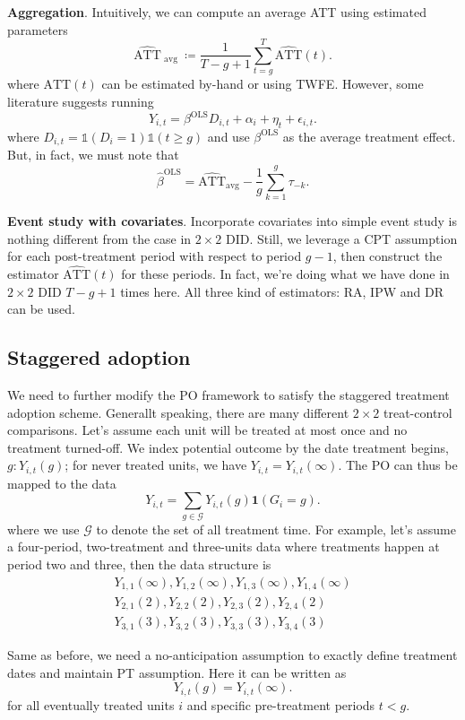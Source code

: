 \documentclass[12pt]{article}
\begin{document}
\textbf{Aggregation}. Intuitively, we can compute an average ATT using estimated parameters
\[
  \widehat{ \text{ATT} }_{\text{ avg }} \coloneqq \frac{1}{T-g+1} \sum_{t=g}^{T}
  \widehat{ \text{ATT} }(t)
.\]
where \( \text{ATT}(t) \) can be estimated by-hand or using TWFE. However, some
literature suggests  running
\[
  Y_{i,t} = \beta^{\text{OLS}} D_{i,t} + \alpha_i + \eta_t + \epsilon_{i,t}
.\]
where \( D_{i,t}=\mathbb{1}(D_{i}=1) \mathbb{1}(t \ge g) \) and use \( \beta^{\text{OLS}}
\) as the average treatment effect.
But, in fact, we must note that
\[
  \hat{\beta}^{\text{OLS}} = \widehat{\text{ATT}}_{\text{avg}} - \frac{1}{g}
  \sum_{k=1}^{g} \tau_{-k}
.\]

\textbf{Event study with covariates}. Incorporate covariates into simple event study is
nothing different from the case in
\( 2 \times 2 \) DID. Still, we leverage a CPT assumption for each post-treatment period
with respect to period \( g-1 \),
then construct the estimator \( \widehat{\text{ATT}}(t) \) for these periods. In fact,
we're doing what we have done
in \( 2 \times 2 \) DID \( T-g+1 \) times here. All three kind of estimators: RA, IPW and
DR can be used.

\subsection{Staggered adoption}

We need to further modify the PO framework to satisfy the staggered treatment adoption
scheme. Generallt speaking, there are
many different \( 2 \times 2 \) treat-control comparisons. Let's assume each unit will be
treated at most once and no
treatment turned-off. We index potential outcome by the date treatment begins, \( g:
Y_{i,t}(g) \); for never treated units,
we have \( Y_{i,t}=Y_{i,t}(\infty) \). The PO can thus be mapped to the data
\[
  Y_{i,t} = \sum_{g \in \mathcal{G}} Y_{i,t}(g) \mathbf{1}(G_{i}=g)
.\]
where we use \( \mathcal{G} \) to denote the set of all treatment time. For example,
let's assume a four-period, two-treatment
and three-units data where treatments happen at period two and three, then the data structure is
\begin{align*}
  Y_{1,1}(\infty),Y_{1,2}(\infty),Y_{1,3}(\infty),Y_{1,4}(\infty) \\
  Y_{2,1}(2), Y_{2,2}(2), Y_{2,3}(2), Y_{2,4}(2) \\
  Y_{3,1}(3), Y_{3,2}(3), Y_{3,3}(3), Y_{3,4}(3)
\end{align*}

Same as before, we need a no-anticipation assumption to exactly define treatment dates
and maintain PT assumption.
Here it can be written as
\[
  Y_{i,t}(g) = Y_{i,t}(\infty)
.\]
for all eventually treated units \( i \) and specific pre-treatment periods \( t < g \).
\end{document}

